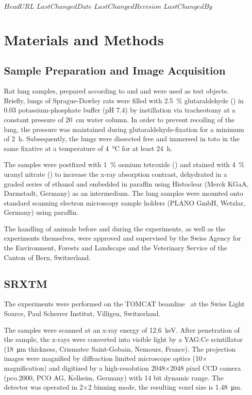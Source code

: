 \svnidlong
{$HeadURL$}
{$LastChangedDate$}
{$LastChangedRevision$}
{$LastChangedBy$}
%
\section{Materials and Methods}
\label{sec:materials and methods}
\subsection{Sample Preparation and Image Acquisition}
Rat lung samples, prepared according to
\ifhtml
	\citet{Tschanz2002} and \citet{Luyet2002}
\else
	 and 
\fi
were used as test objects. Briefly, lungs of Sprague-Dawley rats were filled with \SI{2.5}{\percent} glutaraldehyde () in \SI{0.03}{\Molar} potassium-phosphate buffer (pH 7.4) by instillation via tracheotomy at a constant pressure of \SI{20}{\centi\meter} water column. In order to prevent recoiling of the lung, the pressure was maintained during glutaraldehyde-fixation for a minimum of \SI{2}{\hour}. Subsequently, the lungs were dissected free and immersed in toto in the same fixative at a temperature of \SI{4}{\celsius} for at least \SI{24}{\hour}.

The samples were postfixed with \SI{1}{\percent} osmium tetroxide () and stained with \SI{4}{\percent} uranyl nitrate () to increase the x-ray absorption contrast, dehydrated in a graded series of ethanol and embedded in paraffin using Histoclear (Merck KGaA, Darmstadt, Germany) as an intermedium. The lung samples were mounted onto standard scanning electron microscopy sample holders (PLANO GmbH, Wetzlar, Germany) using paraffin.

The handling of animals before and during the experiments, as well as the experiments themselves, were approved and supervised by the Swiss Agency for the Environment, Forests and Landscape and the Veterinary Service of the Canton of Bern, Switzerland.

\subsection{SRXTM}
The experiments were performed on the TOMCAT beamline~\cite{Stampanoni2006a} at the Swiss Light Source, Paul Scherrer Institut, Villigen, Switzerland. \cbdelete

The samples were scanned at an x-ray energy of \SI{12.6}{\kilo\electronvolt}\cbdelete. After penetration of the sample, the x-rays were converted into visible light by a YAG:Ce scintillator (\SI{18}{\micro\meter} thickness, Crismatec Saint-Gobain, Nemours, France). The projection images were magnified by diffraction limited microscope optics (10$\times$ magnification) and digitized by a high-resolution 2048$\times$2048 pixel CCD camera (pco.2000, PCO AG, Kelheim, Germany) with 14 bit dynamic range. \cbstart The detector was operated in 2$\times$2 binning mode, the resulting voxel size is \SI{1.48}{\micro\meter}.\cbend


